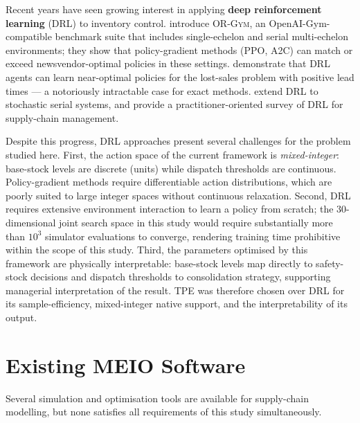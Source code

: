 Recent years have seen growing interest in applying \textbf{deep
reinforcement learning} (DRL) to inventory control.
\citet{HubbsEtAl2020} introduce \textsc{OR-Gym}, an
OpenAI-Gym-compatible benchmark suite that includes single-echelon and
serial multi-echelon environments; they show that policy-gradient methods
(PPO, A2C) can match or exceed newsvendor-optimal policies in these
settings.
\citet{GijsbrechtsEtAl2022} demonstrate that DRL agents can learn
near-optimal policies for the lost-sales problem with positive lead
times — a notoriously intractable case for exact methods.
\citet{PerezEtAl2021} extend DRL to stochastic serial systems, and
\citet{BouteEtAl2022} provide a practitioner-oriented survey of DRL for
supply-chain management.

Despite this progress, DRL approaches present several challenges for the
problem studied here.  First, the action space of the current framework
is \emph{mixed-integer}: base-stock levels are discrete (units) while
dispatch thresholds are continuous.  Policy-gradient methods require
differentiable action distributions, which are poorly suited to large
integer spaces without continuous relaxation.  Second, DRL requires
extensive environment interaction to learn a policy from scratch; the
30-dimensional joint search space in this study would require
substantially more than $10^{3}$ simulator evaluations to converge,
rendering training time prohibitive within the scope of this study.  Third, the
parameters optimised by this framework are physically interpretable:
base-stock levels map directly to safety-stock decisions and dispatch
thresholds to consolidation strategy, supporting managerial interpretation
of the result.  TPE was therefore chosen over DRL for its
sample-efficiency, mixed-integer native support, and the interpretability
of its output.

\section{Existing MEIO Software}
\label{sec:lit:software}

Several simulation and optimisation tools are available for supply-chain
modelling, but none satisfies all requirements of this study simultaneously.

